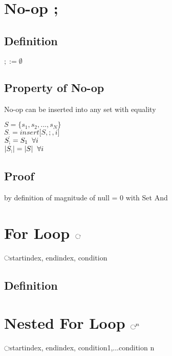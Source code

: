\documentclass[11pt]{article}
\def \loop {\ensuremath{\rotatebox[origin=c]{-90}{$\circlearrowright$}}}
\def \nestedloop {\ensuremath{\rotatebox[origin=c]{-90}{$\circlearrowright$}}^n}
\begin{document}
\newpage
\section{No-op ;}

\subsection{Definition}
\begin{center}
$
; := \emptyset
$
\end{center}

\subsection{Property of No-op}
No-op can be inserted into any set with equality
\begin{center}
$
S= \{s_1,s_2,...,s_N\}
$
\\ \vspace{2mm}
$
S_; = insert \lbrack S,;, i \rbrack
$
\\ \vspace{2mm}
$
S_; = S_1 \hspace{2mm} \forall i
$
\\ \vspace{2mm}
$
|S_;| = |S| \hspace{2mm} \forall i
$
\end{center}


\subsection{Proof}
by definition of magnitude of null = 0 with Set And





\section{For Loop \loop}
\loop \lbrack startindex, endindex, condition\rbrack
\subsection{Definition}








\section{Nested For Loop $\nestedloop$}
\loop \lbrack startindex, endindex, condition1,...condition n\rbrack
\end{document}
